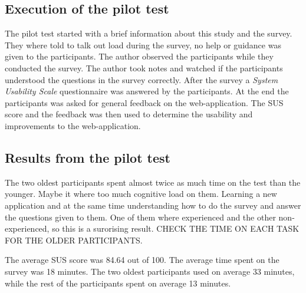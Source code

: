 \subsection{Execution of the pilot test}
The pilot test started with a brief information about this study and the survey. They where told to talk out load during the survey, no help or guidance was given to the participants. The author observed the participants while they conducted the survey. The author took notes and watched if the participants understood the questions in the survey correctly. After the survey a \textit{System Usability Scale} questionnaire was answered by the participants. At the end the participants was asked for general feedback on the web-application. The SUS score and the feedback was then used to determine the usability and improvements to the web-application. 

\subsection{Results from the pilot test}
The two oldest participants spent almost twice as much time on the test than the younger. Maybe it where too much cognitive load on them. Learning a new application and at the same time understanding how to do the survey and answer the questions given to them. One of them where experienced and the other non-experienced, so this is a surorising result.  CHECK THE TIME ON EACH TASK FOR THE OLDER PARTICIPANTS. 

The average SUS score was 84.64 out of 100. 
The average time spent on the survey was 18 minutes. The two oldest participants used on average 33 minutes, while the rest of the participants spent on average 13 minutes. 

